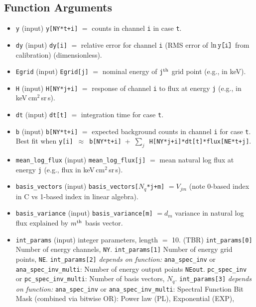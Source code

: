 \documentclass{article}    %
\begin{document}
\subsection{Function Arguments}
\label{secSpecInvArgs}

\begin{itemize}
\item \verb|y| (input) \verb|y[NY*t+i]| $=$ counts in channel \verb|i| in case \verb|t|.
\item \verb|dy| (input) \verb|dy[i]| $=$ relative error for channel \verb|i| (RMS error of $\ln\verb|y[i]|$ from calibration)  (dimensionless).
\item \verb|Egrid| (input) \verb|Egrid[j]| $=$ nominal energy of \verb|j|$^{\rm th}$ grid point (e.g., in keV).
\item \verb|H| (input) \verb|H[NY*j+i]| $=$ response of channel \verb|i| to flux at energy \verb|j| (e.g., in keV\,cm$^2$\,sr\,s).
\item \verb|dt| (input) \verb|dt[t]| $=$ integration time for case \verb|t|.
\item \verb|b| (input) \verb|b[NY*t+i]| $=$ expected background counts in channel \verb|i| for case \verb|t|. Best fit when \verb|y[i]|~$\approx$~\verb|b[NY*t+i]|~+~$\sum_j$~\verb|H[NY*j+i]*dt[t]*flux[NE*t+j]|.
\item \verb|mean_log_flux| (input) \verb|mean_log_flux[j]| $=$ mean natural log flux at energy \verb|j| (e.g., flux in keV\,cm$^2$\,sr\,s).
\item \verb|basis_vectors| (input) \verb|basis_vectors[|$N_q$\verb|*j+m]| $=V_{jm}$ (note 0-based index in C vs 1-based index in linear algebra).
\item \verb|basis_variance| (input) \verb|basis_variance[m]| $=d_m$ variance in natural log flux explained by $m^{\rm th}$ basis vector.
\item \verb|int_params| (input) integer parameters, length $=$ 10. (TBR)
\subitem \verb|int_params[0]| Number of energy channels, \verb|NY|.
\subitem \verb|int_params[1]| Number of energy grid points, \verb|NE|.
\subitem \verb|int_params[2]| {\it depends on function:}
\subsubitem \verb|ana_spec_inv| or \verb|ana_spec_inv_multi|: Number of energy output points \verb|NEout|.
\subsubitem \verb|pc_spec_inv| or \verb|pc_spec_inv_multi|: Number of basis vectors, $N_q$.
\subitem \verb|int_params[3]| {\it depends on function:}
\subsubitem \verb|ana_spec_inv| or \verb|ana_spec_inv_multi|: Spectral Function Bit Mask (combined via bitwise OR):
\subsubitem[1] Power law (PL),
\subsubitem[2] Exponential (EXP),

\end{itemize}
\end{document}
